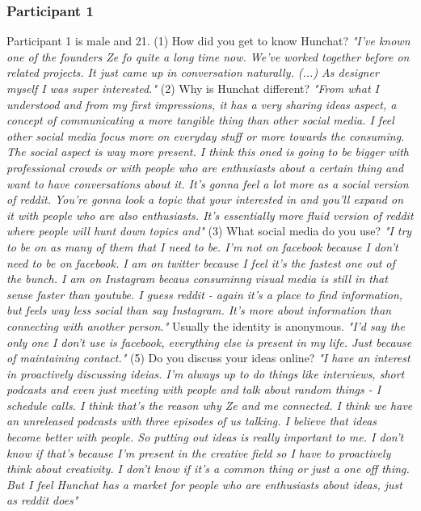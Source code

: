 \documentclass[12pt]{article}
\begin{document}
\subsubsection{Participant 1}
Participant 1 is male and 21.
(1) How did you get to know Hunchat? \textit{"I've known one of the founders Ze fo quite a long time now. We've worked together before on related projects. It just came up in conversation naturally. (...) As designer myself I was super interested."}
(2) Why is Hunchat different? \textit{"From what I understood and from my first impressions, it has a very sharing ideas aspect, a concept of communicating a more tangible thing than other social media. I feel other social media focus more on everyday stuff or more towards the consuming. The social aspect is way more present. I think this oned is going to be bigger with professional crowds or with people who are enthusiasts about a certain thing and want to have conversations about it. It's gonna feel a lot more as a social version of reddit. You're gonna look a topic that your interested in and you'll expand on it with people who are also enthusiasts. It's essentially more fluid version of reddit where people will hunt down topics and"}
(3) What social media do you use? \textit{"I try to be on as many of them that I need to be. I'm not on facebook because I don't need to be on facebook. I am on twitter because I feel it's the fastest one out of the bunch. I am on Instagram becaus consuminng visual media is still in that sense faster than youtube. I guess reddit - again it's a place to find information, but feels way less social than say Instagram. It's more about information than connecting with another person."} Usually the identity is anonymous. \textit{"I'd say the only one I don't use is facebook, everything else is present in my life. Just because of maintaining contact."}
(5) Do you discuss your ideas online?  \textit{"I have an interest in proactively discussing ideias. I'm always up to do things like interviews, short podcasts and even just meeting with people and talk about random things - I schedule calls. I think that's the reason why Ze and me connected. I think we have an unreleased podcasts with three episodes of us talking. I believe that ideas become better with people. So putting out ideas is really important to me. I don't know if that's because I'm present in the creative field so I have to proactively think about creativity. I don't know if it's a common thing or just a one off thing. But I feel Hunchat has a market for people who are enthusiasts about ideas, just as reddit does"}
\end{document}
